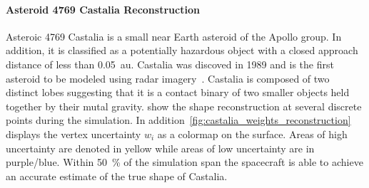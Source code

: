 \paragraph{Asteroid 4769 Castalia Reconstruction}
Asteroic 4769 Castalia is a small near Earth asteroid of the Apollo group.
In addition, it is classified as a potentially hazardous object with a closed approach distance of less than \SI{0.05}{\astronomicalunit}.
Castalia was discoved in \num{1989} and is the first asteroid to be modeled using radar imagery~\cite{hudson1994}.
Castalia is composed of two distinct lobes suggesting that it is a contact binary of two smaller objects held together by their mutal gravity.
 show the shape reconstruction at several discrete points during the simulation.
In addition~\cref{fig:castalia_weights_reconstruction} displays the vertex uncertainty \( w_i \) as a colormap on the surface. 
Areas of high uncertainty are denoted in yellow while areas of low uncertainty are in purple/blue.
Within \SI{50}{\percent} of the simulation span the spacecraft is able to achieve an accurate estimate of the true shape of Castalia.
